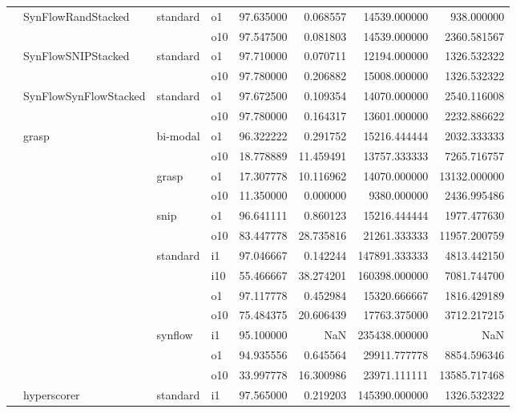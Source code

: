 \begin{longtable}{llllrrrr}
      & SynFlowRandStacked & standard & o1 &  97.635000 &   0.068557 &     14539.000000 &    938.000000 \\
      &     &         & o10 &  97.547500 &   0.081803 &     14539.000000 &   2360.581567 \\
      & SynFlowSNIPStacked & standard & o1 &  97.710000 &   0.070711 &     12194.000000 &   1326.532322 \\
      &     &         & o10 &  97.780000 &   0.206882 &     15008.000000 &   1326.532322 \\
      & SynFlowSynFlowStacked & standard & o1 &  97.672500 &   0.109354 &     14070.000000 &   2540.116008 \\
      &     &         & o10 &  97.780000 &   0.164317 &     13601.000000 &   2232.886622 \\
      & grasp & bi-modal & o1 &  96.322222 &   0.291752 &     15216.444444 &   2032.333333 \\
      &     &         & o10 &  18.778889 &  11.459491 &     13757.333333 &   7265.716757 \\
      &     & grasp & o1 &  17.307778 &  10.116962 &     14070.000000 &  13132.000000 \\
      &     &         & o10 &  11.350000 &   0.000000 &      9380.000000 &   2436.995486 \\
      &     & snip & o1 &  96.641111 &   0.860123 &     15216.444444 &   1977.477630 \\
      &     &         & o10 &  83.447778 &  28.735816 &     21261.333333 &  11957.200759 \\
      &     & standard & i1 &  97.046667 &   0.142244 &    147891.333333 &   4813.442150 \\
      &     &         & i10 &  55.466667 &  38.274201 &    160398.000000 &   7081.744700 \\
      &     &         & o1 &  97.117778 &   0.452984 &     15320.666667 &   1816.429189 \\
      &     &         & o10 &  75.484375 &  20.606439 &     17763.375000 &   3712.217215 \\
      &     & synflow & i1 &  95.100000 &        NaN &    235438.000000 &           NaN \\
      &     &         & o1 &  94.935556 &   0.645564 &     29911.777778 &   8854.596346 \\
      &     &         & o10 &  33.997778 &  16.300986 &     23971.111111 &  13585.717468 \\
      & hyperscorer & standard & i1 &  97.565000 &   0.219203 &    145390.000000 &   1326.532322 \\

\end{longtable}
